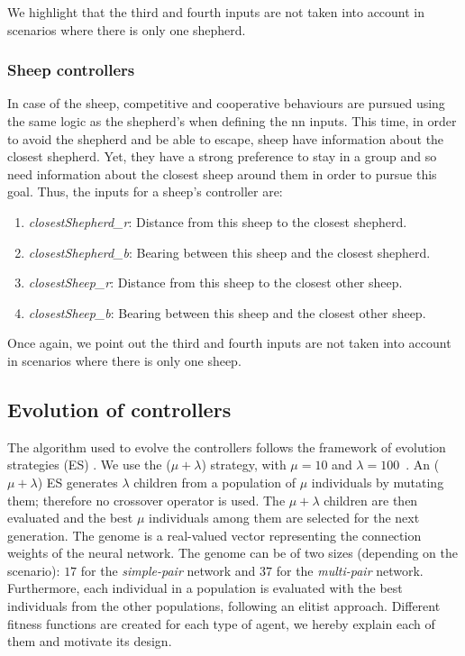 \documentclass[conference]{IEEEtran}
\begin{document}
We highlight that the third and fourth inputs are not taken into account in scenarios where there is only one shepherd. 

\vspace{0.5em}
\subsubsection{Sheep controllers}
In case of the sheep, competitive and cooperative behaviours are pursued using the same logic as the shepherd's when defining the \gls{nn} inputs. 
This time, in order to avoid the shepherd and be able to escape, sheep have information about the closest shepherd. 
Yet, they have a strong preference to stay in a group and so need information about the closest sheep around them in order to pursue this goal. 
Thus, the inputs for a sheep's controller are:

\begin{enumerate}
	\item \textit{closestShepherd\_r}: Distance from this sheep to the closest shepherd.
	\item \textit{closestShepherd\_b}: Bearing between this sheep and the closest shepherd.
	\item \textit{closestSheep\_r}: Distance from this sheep to the closest other sheep.
	\item \textit{closestSheep\_b}: Bearing between this sheep and the closest other sheep.
\end{enumerate}

Once again, we point out the third and fourth inputs are not taken into account in scenarios where there is only one sheep. 

\subsection{Evolution of controllers}
\label{sec:controllers_evolution}
The algorithm used to evolve the controllers follows the framework of evolution strategies (ES) \cite{back1993overview}. 
We use the ($\mu + \lambda$) strategy, with $\mu = 10$ and $\lambda = 100$~\cite{eiben2003introduction}. 
An ($\mu + \lambda$) ES generates $\lambda$ children from a population of $\mu$ individuals by mutating them; therefore no crossover operator is used.
The $\mu + \lambda$ children are then evaluated and the best $\mu$ individuals among them are selected for the next generation.
The genome is a real-valued vector representing the connection weights of the neural network.
The genome can be of two sizes (depending on the scenario): $17$ for the \textit{simple-pair} network and $37$ for the \textit{multi-pair} network. 
Furthermore, each individual in a population is evaluated with the best individuals from the other populations, following an elitist approach.
Different fitness functions are created for each type of agent, we hereby explain each of them and motivate its design.
\end{document}
